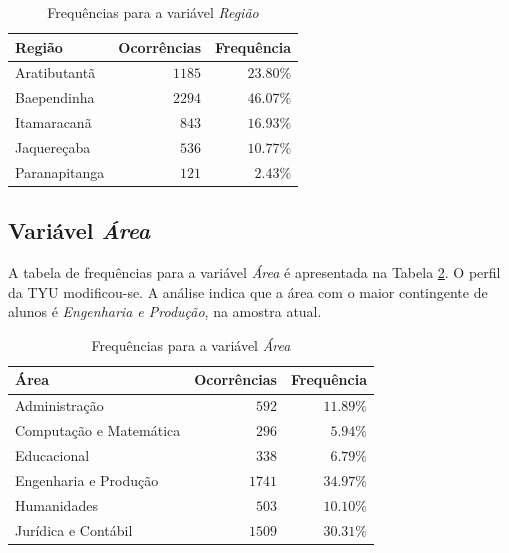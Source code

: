 \documentclass[10pt,a4paper,oneside]{article}
\newcommand{\arat}{Aratibutantã\xspace}
\newcommand{\baep}{Baependinha\xspace}
\newcommand{\itam}{Itamaracanã\xspace}
\newcommand{\jaqu}{Jaquereçaba\xspace}
\newcommand{\para}{Paranapitanga\xspace}
\newcommand{\adm}{Administração\xspace}
\newcommand{\comp}{Computação e Matemática\xspace}
\newcommand{\edu}{Educacional\xspace}
\newcommand{\eng}{Engenharia e Produção\xspace}
\newcommand{\hum}{Humanidades\xspace}
\newcommand{\jur}{Jurídica e Contábil\xspace}
\begin{document}
\begin{table}[h]
\small
\centering
\caption{Frequências para a variável \textit{Região}}
\label{table: frequencias regiao}
\vspace{0.5em}
\begin{tabular}{l r r}
	\toprule
	\textbf{Região} & \textbf{Ocorrências} & \textbf{Frequência} \\
	\midrule
	\arat           & $1185$               & $23.80\%$           \\
	\baep           & $2294$               & $46.07\%$           \\
	\itam           & $843$                & $16.93\%$           \\
	\jaqu           & $536$                & $10.77\%$           \\
	\para           & $121$                & $2.43\%$            \\
	\bottomrule
\end{tabular}
\end{table}

\subsection*{Variável \textit{Área}}

A tabela de frequências para a variável \textit{Área} é apresentada na Tabela \ref{table: frequencias area}. O perfil da TYU modificou-se. A análise indica que a área com o maior contingente de alunos é \textit{\eng}, na amostra atual.

\begin{table}[h]
\small
\centering
\caption{Frequências para a variável \textit{Área}}
\label{table: frequencias area}
\vspace{0.5em}
\begin{tabular}{l r r}
	\toprule
	\textbf{Área} & \textbf{Ocorrências} & \textbf{Frequência} \\
	\midrule
	\adm            & $592$                & $11.89\%$           \\
	\comp           & $296$                & $5.94\%$            \\
	\edu            & $338$                & $6.79\%$            \\
	\eng            & $1741$               & $34.97\%$           \\
	\hum            & $503$                & $10.10\%$           \\
	\jur            & $1509$               & $30.31\%$           \\
	\bottomrule
\end{tabular}
\end{table}
\end{document}
